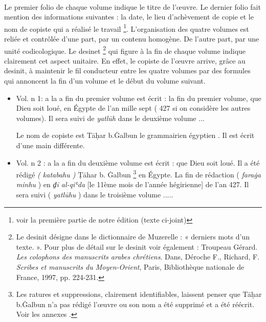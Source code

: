\documentclass[a4paper,12pt]{report}
\begin{document}
\begin{itemize}
\begin{enumerate}
\paragraph{}
Le premier folio de chaque volume  indique le titre de l’œuvre. Le  dernier folio fait mention des informations suivantes : la date, le lieu d’achèvement de copie  et le nom de copiste qui a réalisé le travail \footnote{voir la première partie de notre édition (texte ci-joint)}. L’organisation des quatre volumes est  reliée et contrôlée d’une part,  par un contenu homogène. De l’autre part, par une  unité codicologique. Le  desinet \footnote {Le desinit désigne dans le dictionnaire de Muzerelle : « derniers mots d'un texte. ». Pour plus de détail sur le desinit voir également :  Troupeau Gérard. \textit{Les colophons des manuscrits arabes chrétiens}. Dans, Déroche F., Richard, F. \textit{Scribes et manuscrits du Moyen-Orient}, Paris, Bibliothèque nationale de France, 1997, pp. 224-231.} qui figure à la fin de chaque volume indique clairement cet aspect unitaire. En effet, le copiste de l’œuvre arrive, grâce au desinit, à maintenir le fil conducteur entre les quatre volumes par des formules qui annoncent la fin d’un volume et le  début du  volume suivant. 

\begin{itemize}
    \item  	Vol. n 1: a la a fin du premier volume est écrit : la fin du premier volume, que Dieu soit loué, en Égypte  de l’an mille sept ( 427 si on considère les autres volumes). Il sera suivi de \textit{yatlūh} dans le deuxième volume ...
    
    Le nom de copiste est Tāḥar b.Ġalbun le grammairien égyptien . Il est écrit d'une main différente. 
    
    \item Vol. n 2 : a la a fin du deuxième volume est écrit :  que Dieu soit loué. Il a été rédigé \textit{( katabahu ) } Ṭāhar b. Ġalbun \footnote{Les ratures et suppressions, clairement identifiables, laissent penser que  Tāḥar b.Ġalbun  n’a pas rédigé l’œuvre ou son nom a été supprimé et a été réécrit.   Voir les annexes .} en Égypte. La fin de rédaction ( \textit{faraġa minhu} ) en \textit{d̠ī al-qiʿda }[le 11ème mois de l’année hégirienne] de l’an 427. Il sera suivi ( \textit{yatlūhu} ) dans le troisième volume ..... 
   

\end{itemize}
\end{enumerate}
\end{itemize}
\end{document}
